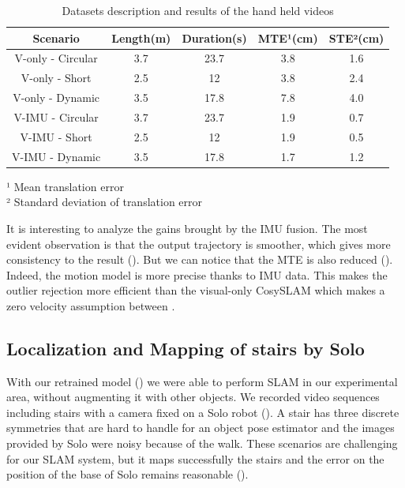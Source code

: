 \begin{table}[h]
    \begin{center}
    \caption{Datasets description and results of the hand held videos}
    \label{tab:tless}
    \begin{tabular}{|c|c|c|c|c|}
        \hline 
        Scenario  & Length(m) & Duration(s) & MTE¹(cm) & STE²(cm) \\
        \hline 
         V-only - Circular & 3.7 & 23.7 & 3.8 & 1.6\\
        \hline 
         V-only - Short & 2.5 & 12 & 3.8 & 2.4 \\
        \hline 
         V-only - Dynamic & 3.5 & 17.8 & 7.8 & 4.0  \\
        \hline 
         V-IMU - Circular & 3.7 & 23.7 & 1.9 & 0.7\\
        \hline 
         V-IMU - Short & 2.5 & 12 & 1.9 & 0.5 \\
        \hline 
         V-IMU - Dynamic & 3.5 & 17.8 & 1.7 & 1.2  \\
        \hline
    \end{tabular}
    \end{center}
¹ Mean translation error \\
² Standard deviation of translation error
\end{table}

It is interesting to analyze the gains brought by the IMU fusion. The most evident observation is that the output trajectory is smoother, which gives more consistency 
to the result (). But we can notice that the MTE is also reduced (). Indeed, the motion model is more precise thanks 
to IMU data. This makes the outlier rejection more efficient than the visual-only CosySLAM which makes a zero velocity assumption between \keyframes.




\subsection{Localization and Mapping of stairs by Solo}

With our retrained model () we were able to perform SLAM in our experimental area, without augmenting it with other objects. 
We recorded video sequences including stairs with a camera fixed on a Solo robot (). A stair has three discrete symmetries 
that are hard to handle for an object pose estimator and the images provided by Solo were noisy because of the walk. 
These scenarios are challenging for our SLAM system, but it maps successfully the stairs and the error on the position of the base of Solo remains reasonable 
().

